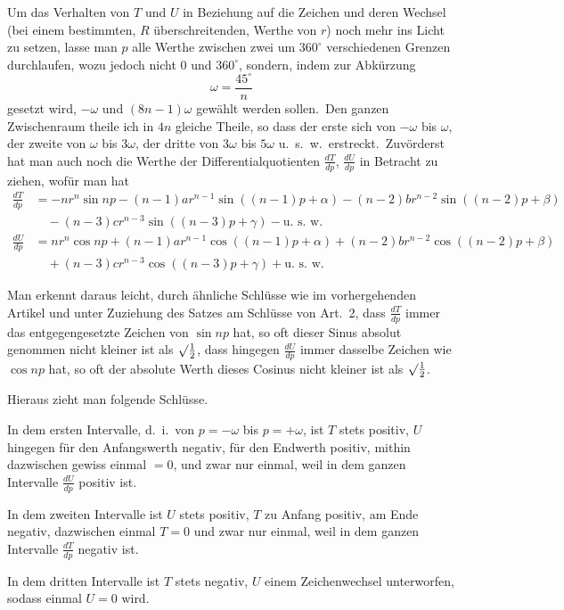 \documentclass[12pt,a4paper]{article}
\theoremstyle{plain}
\begin{document}
Um das Verhalten von $T$ und $U$ in Beziehung auf die Zeichen und deren
Wechsel (bei einem bestimmten, $R$ überschreitenden, Werthe von $r$) noch mehr
ins Licht zu setzen, lasse man $p$ alle Werthe zwischen zwei um $360^\circ$ verschiedenen Grenzen durchlaufen, wozu jedoch nicht $0$ und $360^\circ$, sondern, indem zur
Abkürzung
\[
\omega = \frac{45^\circ}{n}
\]
gesetzt wird, $-\omega$ und $(8n - 1)\omega$ gewählt werden sollen.\ Den ganzen Zwischenraum theile ich in $4n$ gleiche Theile, so dass der erste sich von $-\omega$ bis $\omega$,
der zweite von $\omega$ bis $3\omega$, der dritte von $3\omega$ bis $5\omega$ u.\ s.\ w.\ erstreckt.\ Zuvörderst hat man auch noch die Werthe der Differentialquotienten $\frac{dT}{dp}$, $\frac{dU}{dp}$
in Betracht zu ziehen, wofür man hat
\begin{align*}
\frac{dT}{dp} &= -nr^n \sin np - (n-1)ar^{n-1} \sin((n-1)p + \alpha) - (n-2)br^{n-2} \sin((n-2)p + \beta) \\
&\quad - (n-3)cr^{n-3} \sin((n-3)p + \gamma) - \text{u.\ s.\ w.} \\
\frac{dU}{dp} &= nr^n \cos np + (n-1)ar^{n-1} \cos((n-1)p + \alpha) + (n-2)br^{n-2} \cos((n-2)p + \beta) \\
&\quad + (n-3)cr^{n-3} \cos((n-3)p + \gamma) + \text{u.\ s.\ w.}
\end{align*}

Man erkennt daraus leicht, durch ähnliche Schlüsse wie im vorhergehenden Artikel und unter Zuziehung des Satzes am Schlüsse von Art.\ 2, dass $\frac{dT}{dp}$ immer
das entgegengesetzte Zeichen von $\sin np$ hat, so oft dieser Sinus absolut genommen nicht kleiner ist als $\surd \frac{1}{2}$, dass hingegen $\frac{dU}{dp}$ immer dasselbe Zeichen wie
$\cos np$ hat, so oft der absolute Werth dieses Cosinus nicht kleiner ist als $\surd \frac{1}{2}$.

Hieraus zieht man folgende Schlüsse.

In dem ersten Intervalle, d.\ i.\ von $p = -\omega$ bis $p = +\omega$, ist $T$ stets
positiv, $U$ hingegen für den Anfangswerth negativ, für den Endwerth positiv,
mithin dazwischen gewiss einmal $= 0$, und zwar nur einmal, weil in dem ganzen Intervalle $\frac{dU}{dp}$ positiv ist.

In dem zweiten Intervalle ist $U$ stets positiv, $T$ zu Anfang positiv, am Ende negativ, dazwischen einmal $T = 0$ und zwar nur einmal, weil in dem ganzen Intervalle $\frac{dT}{dp}$ negativ ist.

In dem dritten Intervalle ist $T$ stets negativ, $U$ einem Zeichenwechsel unterworfen, sodass einmal $U = 0$ wird.
\end{document}
